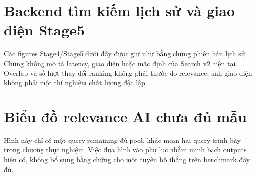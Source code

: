 \section{Backend tìm kiếm lịch sử và giao diện Stage5}
Các figures Stage4/Stage5 dưới đây được giữ như bằng chứng phiên bản lịch sử. Chúng không mô tả latency, giao diện hoặc mặc định của Search v2 hiện tại. Overlap và số lượt thay đổi ranking không phải thước đo relevance; ảnh giao diện không phải một thí nghiệm chất lượng độc lập.


\section{Biểu đồ relevance AI chưa đủ mẫu}
Hình này chỉ có một query remaining đủ pool, khác mean hai query trình bày trong chương thực nghiệm. Việc đưa hình vào phụ lục nhằm minh bạch outputs hiện có, không bổ sung bằng chứng cho một tuyên bố thắng trên benchmark đầy đủ.

